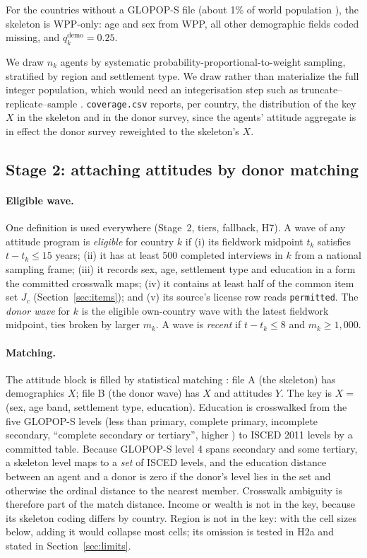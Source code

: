 \documentclass[10pt]{article}
\begin{document}
For the countries without a GLOPOP-S file (about 1\% of world population \citep{ton2024glopop}), the skeleton is WPP-only: age and sex from WPP, all other demographic fields coded missing, and $q^{\text{demo}}_k = 0.25$.

We draw $n_k$ agents by systematic probability-proportional-to-weight sampling, stratified by region and settlement type. We draw rather than materialize the full integer population, which would need an integerisation step such as truncate--replicate--sample \citep{lovelace2013trs}. \nolinkurl{coverage.csv} reports, per country, the distribution of the key $X$ in the skeleton and in the donor survey, since the agents' attitude aggregate is in effect the donor survey reweighted to the skeleton's $X$.

\subsection{Stage 2: attaching attitudes by donor matching}
\label{sec:stage2}

\paragraph{Eligible wave.} One definition is used everywhere (Stage~2, tiers, fallback, H7). A wave of any attitude program is \emph{eligible} for country $k$ if (i) its fieldwork midpoint $t_k$ satisfies $t - t_k \le 15$ years; (ii) it has at least 500 completed interviews in $k$ from a national sampling frame; (iii) it records sex, age, settlement type and education in a form the committed crosswalk maps; (iv) it contains at least half of the common item set $J_c$ (Section~\ref{sec:items}); and (v) its source's license row reads \texttt{permitted}. The \emph{donor wave} for $k$ is the eligible own-country wave with the latest fieldwork midpoint, ties broken by larger $m_k$. A wave is \emph{recent} if $t - t_k \le 8$ and $m_k \ge 1{,}000$.

\paragraph{Matching.} The attitude block is filled by statistical matching \citep{dorazio2006,rassler2002}: file A (the skeleton) has demographics $X$; file B (the donor wave) has $X$ and attitudes $Y$. The key is $X = $ (sex, age band, settlement type, education). Education is crosswalked from the five GLOPOP-S levels (less than primary, complete primary, incomplete secondary, ``complete secondary or tertiary'', higher \citep{ton2024glopop}) to ISCED 2011 levels \citep{isced2011} by a committed table. Because GLOPOP-S level 4 spans secondary and some tertiary, a skeleton level maps to a \emph{set} of ISCED levels, and the education distance between an agent and a donor is zero if the donor's level lies in the set and otherwise the ordinal distance to the nearest member. Crosswalk ambiguity is therefore part of the match distance. Income or wealth is not in the key, because its skeleton coding differs by country. Region is not in the key: with the cell sizes below, adding it would collapse most cells; its omission is tested in H2a and stated in Section~\ref{sec:limits}.
\end{document}
